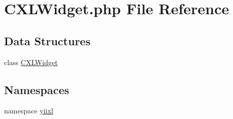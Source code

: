 \hypertarget{CXLWidget_8php}{
\section{CXLWidget.php File Reference}
\label{CXLWidget_8php}
}
\subsection*{Data Structures}
\begin{DoxyCompactItemize}
\item 
class \hyperlink{classCXLWidget}{CXLWidget}
\end{DoxyCompactItemize}
\subsection*{Namespaces}
\begin{DoxyCompactItemize}
\item 
namespace \hyperlink{namespaceyiixl}{yiixl}
\end{DoxyCompactItemize}
